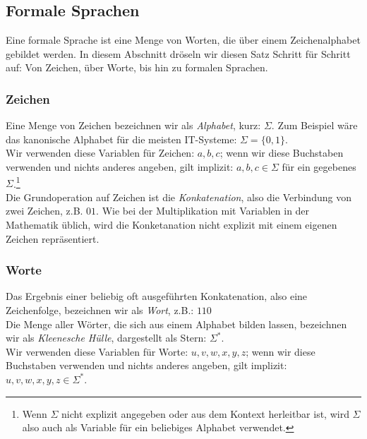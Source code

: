 \subsection{Formale Sprachen}\label{subsec:formaleSprachen}

Eine formale Sprache ist eine Menge von Worten,
die über einem Zeichenalphabet gebildet werden.
In diesem Abschnitt dröseln wir diesen Satz Schritt für Schritt auf:
Von Zeichen, über Worte, bis hin zu formalen Sprachen.

\subsubsection{Zeichen}

Eine Menge von Zeichen bezeichnen wir als \emph{Alphabet}, kurz: $\Sigma$.
Zum Beispiel wäre das kanonische Alphabet für die meisten IT-Systeme: $\Sigma = \{0,1\}$.\\

\noindent
Wir verwenden diese Variablen für Zeichen: $a,b,c$;
wenn wir diese Buchstaben verwenden und nichts anderes angeben,
gilt implizit: $a, b, c \in \Sigma$ für ein gegebenes $\Sigma$.\footnote{
Wenn $\Sigma$ nicht explizit angegeben oder aus dem Kontext herleitbar ist,
wird $\Sigma$ also auch als Variable für ein beliebiges Alphabet verwendet.}\\

\noindent
Die Grundoperation auf Zeichen ist die \emph{Konkatenation},
also die Verbindung von zwei Zeichen, z.B. $01$.
Wie bei der Multiplikation mit Variablen in der Mathematik üblich,
wird die Konketanation nicht explizit mit einem eigenen Zeichen repräsentiert.

\subsubsection{Worte}
Das Ergebnis einer beliebig oft ausgeführten Konkatenation,
also eine Zeichenfolge,
bezeichnen wir als \emph{Wort}, z.B.: $110$\\

\noindent
Die Menge aller Wörter,
die sich aus einem Alphabet bilden lassen,
bezeichnen wir als \emph{Kleenesche Hülle}, dargestellt als Stern: $\Sigma^*$.\\

\noindent
Wir verwenden diese Variablen für Worte:
$u, v, w, x, y, z$; wenn wir diese Buchstaben verwenden und nichts anderes angeben,
gilt implizit: $u, v, w, x, y, z \in \Sigma^*$.\\

